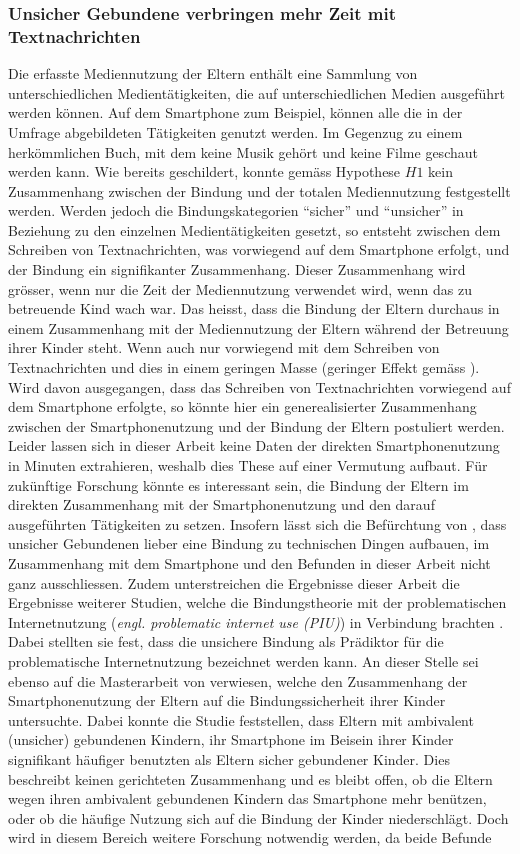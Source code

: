 \subsubsection{Unsicher Gebundene verbringen mehr Zeit mit Textnachrichten}
Die erfasste Mediennutzung der Eltern enthält eine Sammlung von unterschiedlichen Medientätigkeiten, die auf unterschiedlichen Medien ausgeführt werden können. Auf dem Smartphone zum Beispiel, können alle die in der Umfrage abgebildeten Tätigkeiten genutzt werden. Im Gegenzug zu einem herkömmlichen Buch, mit dem keine Musik gehört und keine Filme geschaut werden kann. Wie bereits geschildert, konnte gemäss Hypothese $H1$ kein Zusammenhang zwischen der Bindung und der totalen Mediennutzung festgestellt werden. Werden jedoch die Bindungskategorien \enquote{sicher} und \enquote{unsicher} in Beziehung zu den einzelnen Medientätigkeiten gesetzt, so entsteht zwischen dem Schreiben von Textnachrichten, was vorwiegend auf dem Smartphone erfolgt, und der Bindung ein signifikanter Zusammenhang. Dieser Zusammenhang wird grösser, wenn nur die Zeit der Mediennutzung verwendet wird, wenn das zu betreuende Kind wach war. Das heisst, dass die Bindung der Eltern durchaus in einem Zusammenhang mit der Mediennutzung der Eltern während der Betreuung ihrer Kinder steht. Wenn auch nur vorwiegend mit dem Schreiben von Textnachrichten und dies in einem geringen Masse (geringer Effekt gemäss ). Wird davon ausgegangen, dass das Schreiben von Textnachrichten vorwiegend auf dem Smartphone erfolgte, so könnte hier ein generealisierter Zusammenhang zwischen der Smartphonenutzung und der Bindung der Eltern postuliert werden. Leider lassen sich in dieser Arbeit keine Daten der direkten Smartphonenutzung in Minuten extrahieren, weshalb dies These auf einer Vermutung aufbaut. Für zukünftige Forschung könnte es interessant sein, die Bindung der Eltern im direkten Zusammenhang mit der Smartphonenutzung und den darauf ausgeführten Tätigkeiten zu setzen. Insofern lässt sich die Befürchtung von , dass unsicher Gebundenen lieber eine Bindung zu technischen Dingen aufbauen, im Zusammenhang mit dem Smartphone und den Befunden in dieser Arbeit nicht ganz ausschliessen. Zudem unterstreichen die Ergebnisse dieser Arbeit die Ergebnisse weiterer Studien, welche die Bindungstheorie mit der problematischen Internetnutzung (\textit{engl. problematic internet use (PIU)}) in Verbindung brachten \cite{Jia2016, Chang2015, Lin2011a}. Dabei stellten sie fest, dass die unsichere Bindung als Prädiktor für die problematische Internetnutzung bezeichnet werden kann. An dieser Stelle sei ebenso auf die Masterarbeit von  verwiesen, welche den Zusammenhang der Smartphonenutzung der Eltern auf die Bindungssicherheit ihrer Kinder untersuchte. Dabei konnte die Studie feststellen, dass Eltern mit ambivalent (unsicher) gebundenen Kindern, ihr Smartphone im Beisein ihrer Kinder signifikant häufiger benutzten als Eltern sicher gebundener Kinder. Dies beschreibt keinen gerichteten Zusammenhang und es bleibt offen, ob die Eltern wegen ihren ambivalent gebundenen Kindern das Smartphone mehr benützen, oder ob die häufige Nutzung sich auf die Bindung der Kinder niederschlägt. Doch wird in diesem Bereich weitere Forschung notwendig werden, da beide Befunde 